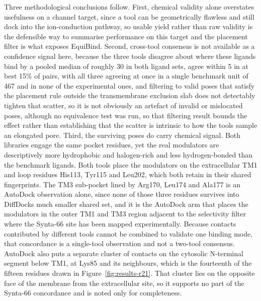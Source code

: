 Three methodological conclusions follow. First, chemical validity alone overstates usefulness on a channel target, since a tool can be geometrically flawless and still dock into the ion-conduction pathway, so usable yield rather than raw validity is the defensible way to summarise performance on this target and the placement filter is what exposes EquiBind. Second, cross-tool consensus is not available as a confidence signal here, because the three tools disagree about where these ligands bind by a pooled median of roughly 30 \angstrom{} in both ligand sets, agree within 5 \angstrom{} in at best 15\% of pairs, with all three agreeing at once in a single benchmark unit of 467 and in none of the experimental ones, and filtering to valid poses that satisfy the placement rule outside the transmembrane exclusion slab does not detectably tighten that scatter, so it is not obviously an artefact of invalid or mislocated poses, although no equivalence test was run, so that filtering result bounds the effect rather than establishing that the scatter is intrinsic to how the tools sample an elongated pore. Third, the surviving poses do carry chemical signal. Both libraries engage the same pocket residues, yet the real modulators are descriptively more hydrophobic and halogen-rich and less hydrogen-bonded than the benchmark ligands. Both tools place the modulators on the extracellular TM1 and loop residues His113, Tyr115 and Leu202, which both retain in their shared fingerprints. The TM3 sub-pocket lined by Arg170, Leu174 and Ala177 is an AutoDock observation alone, since none of those three residues survives into DiffDock\textquotesingle s much smaller shared set, and it is the AutoDock arm that places the modulators in the outer TM1 and TM3 region adjacent to the selectivity filter where the Synta-66 site has been mapped experimentally. Because contacts contributed by different tools cannot be combined to validate one binding mode, that concordance is a single-tool observation and not a two-tool consensus. AutoDock also puts a separate cluster of contacts on the cytosolic N-terminal segment below TM1, at Lys85 and its neighbours, which is the fourteenth of the fifteen residues drawn in Figure~\ref{fig:results-r21}. That cluster lies on the opposite face of the membrane from the extracellular site, so it supports no part of the Synta-66 concordance and is noted only for completeness.

